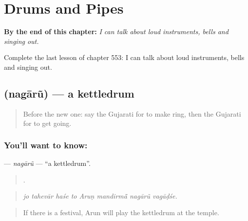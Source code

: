 
\chapter{Drums and Pipes}
\label{ch:gu-drums-and-pipes}

\begin{chapteropening}
\textbf{By the end of this chapter:} \emph{I can talk about loud instruments, bells and singing out.}

Complete the last lesson of chapter 553: I can talk about loud instruments, bells and singing out.
\end{chapteropening}

\section[\texorpdfstring{\gu{નગારું} (nagārũ)}{નગારું (nagārũ)}]{ (nagārũ) — a kettledrum}

\label{lesson:GU-C553-nagaru}



\begin{quote}
Before the new one: say the Gujarati for to make ring, then the Gujarati for to get going.
\end{quote}

\subsection*{You'll want to know: }
\textbf{} — \emph{nagārũ} — \textquotedblleft{}a kettledrum\textquotedblright{}.

\begin{quote}
       .
\end{quote}

\begin{quote}
\emph{jo tahevār haśe to Aruṇ mandirmā̃ nagārũ vagāḍśe.}
\end{quote}

\begin{quote}
If there is a festival, Arun will play the kettledrum at the temple.
\end{quote}

